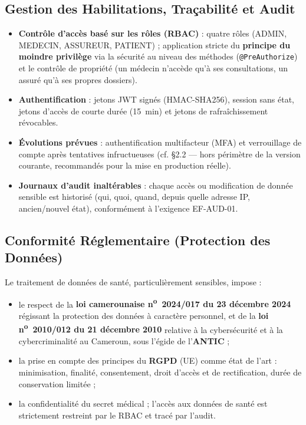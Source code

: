 \documentclass[11pt,a4paper]{article}
\begin{document}
\subsection{Gestion des Habilitations, Traçabilité et Audit}
\begin{itemize}[leftmargin=1.4em]
  \item \textbf{Contrôle d'accès basé sur les rôles (RBAC)} : quatre rôles (ADMIN,
  MEDECIN, ASSUREUR, PATIENT) ; application stricte du \textbf{principe du moindre
  privilège} via la sécurité au niveau des méthodes (\texttt{@PreAuthorize}) et le
  contrôle de propriété (un médecin n'accède qu'à ses consultations, un assuré qu'à
  ses propres dossiers).
  \item \textbf{Authentification} : jetons JWT signés (HMAC-SHA256), session sans état,
  jetons d'accès de courte durée (15~min) et jetons de rafraîchissement révocables.
  \item \textbf{Évolutions prévues} : authentification multifacteur (MFA) et
  verrouillage de compte après tentatives infructueuses (cf. §2.2 — hors périmètre de
  la version courante, recommandés pour la mise en production réelle).
  \item \textbf{Journaux d'audit inaltérables} : chaque accès ou modification de donnée
  sensible est historisé (qui, quoi, quand, depuis quelle adresse IP, ancien/nouvel
  état), conformément à l'exigence EF-AUD-01.
\end{itemize}

\subsection{Conformité Réglementaire (Protection des Données)}
Le traitement de données de santé, particulièrement sensibles, impose :
\begin{itemize}[leftmargin=1.4em]
  \item le respect de la \textbf{loi camerounaise n\textsuperscript{o}~2024/017 du
  23 décembre 2024} régissant la protection des données à caractère personnel, et de
  la \textbf{loi n\textsuperscript{o}~2010/012 du 21 décembre 2010} relative à la
  cybersécurité et à la cybercriminalité au Cameroun, sous l'égide de l'\textbf{ANTIC} ;
  \item la prise en compte des principes du \textbf{RGPD} (UE) comme état de l'art :
  minimisation, finalité, consentement, droit d'accès et de rectification, durée de
  conservation limitée ;
  \item la confidentialité du secret médical ; l'accès aux données de santé est
  strictement restreint par le RBAC et tracé par l'audit.
\end{itemize}
\end{document}
